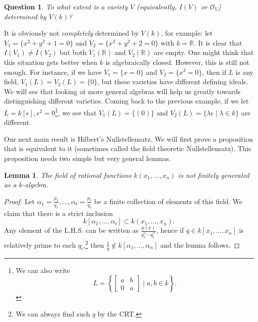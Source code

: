 \documentclass{tufte-handout} %
\newtheorem{lem}[thm]{Lemma}
\newtheorem{quest}[thm]{Question}
\theoremstyle{definition}
\theoremstyle{remark}
\newcommand{\R}{\mathbb{R}}
\newcommand{\mO}{\mathcal{O}}
\begin{document}
\begin{quest}\label{questvar}
	To what extent is a variety $V$ (equivalently, $I(V)$ or $\mO_V$) determined by $V(k)$?
\end{quest}
It is obviously not \textit{completely} determined by $V(k)$, for example: let $V_1 = \{x^2+y^2+1 = 0\}$ and $V_2 = \{x^2+y^2+2 = 0\}$ with $k = \R$. It is clear that $I(V_1) \neq I(V_2)$ but both $V_1(\R)$ and $V_2(\R)$ are empty. One might think that this situation gets better when $k$ is algebraically closed. However, this is still not enough. For instance, if we have $V_1 = \{x = 0\}$ and $V_2 = \{x^2 = 0\}$, then if $L$ is any field, $V_1(L) = V_2(L) = \{0\}$, but these varieties have different defining ideals. We will see that looking at more general algebras will help us greatly towards distinguishing different varieties. Coming back to the previous example, if we let $L = k[\epsilon], \epsilon^2 = 0$\footnote{We can also write\[L = \left\{\begin{bmatrix}a&b\\0&a\end{bmatrix} \mid a,b \in k\right\}.\]}, we see that $V_1(L)= \{(0)\}$ and $V_2(L) = \{\lambda \epsilon \mid \lambda \in k\}$ are different.


Our next main result is Hilbert's Nullstellensatz. We will first prove a proposition that is equivalent to it (sometimes called the field theoretic Nullstellensatz). This proposition needs two simple but very general lemmas.

\begin{lem}\label{rationotfg}
	The field of rational functions $k(x_1, \dots, x_n)$ is not finitely generated as a $k$-algebra.
\end{lem}
\begin{proof}
	Let $\alpha_1 = \frac{p_1}{q_1}, \dots, \alpha_t = \frac{p_t}{q_t}$ be a finite collection of elements of this field. We claim that there is a strict inclusion \[k[\alpha_1, \dots, \alpha_t] \subset k(x_1, \dots, x_n).\] Any element of the L.H.S. can be written as $\frac{p(x)}{q_1^{r_1}\cdots q_t^{r_t}}$, hence if $q\in k[x_1, \dots, x_n]$ is relatively prime to each $q_i$,\footnote{We can always find such $q$ by the CRT.} then $\frac{1}{q} \notin k[\alpha_1, \dots, \alpha_n]$ and the lemma follows.
\end{proof}
\end{document}
